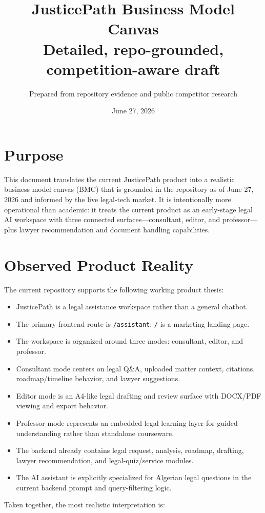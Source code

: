 \documentclass[11pt]{article}
\title{JusticePath Business Model Canvas\\\large Detailed, repo-grounded, competition-aware draft}
\author{Prepared from repository evidence and public competitor research}
\date{June 27, 2026}
\begin{document}
\maketitle

\section*{Purpose}
This document translates the current JusticePath product into a realistic business model canvas (BMC) that is grounded in the repository as of June 27, 2026 and informed by the live legal-tech market. It is intentionally more operational than academic: it treats the current product as an early-stage legal AI workspace with three connected surfaces---consultant, editor, and professor---plus lawyer recommendation and document handling capabilities.

\section*{Observed Product Reality}
The current repository supports the following working product thesis:
\begin{itemize}
  \item JusticePath is a legal assistance workspace rather than a general chatbot.
  \item The primary frontend route is \texttt{/assistant}; \texttt{/} is a marketing landing page.
  \item The workspace is organized around three modes: consultant, editor, and professor.
  \item Consultant mode centers on legal Q\&A, uploaded matter context, citations, roadmap/timeline behavior, and lawyer suggestions.
  \item Editor mode is an A4-like legal drafting and review surface with DOCX/PDF viewing and export behavior.
  \item Professor mode represents an embedded legal learning layer for guided understanding rather than standalone courseware.
  \item The backend already contains legal request, analysis, roadmap, drafting, lawyer recommendation, and legal-quiz/service modules.
  \item The AI assistant is explicitly specialized for Algerian legal questions in the current backend prompt and query-filtering logic.
\end{itemize}

Taken together, the most realistic interpretation is:
\end{document}
